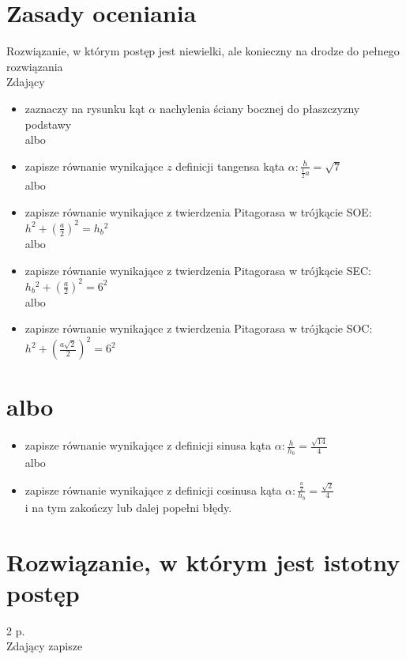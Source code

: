 \documentclass[10pt]{article}
\begin{document}
\section*{Zasady oceniania}
Rozwiązanie, w którym postęp jest niewielki, ale konieczny na drodze do pełnego rozwiązania\\
Zdający

\begin{itemize}
  \item zaznaczy na rysunku kąt $\alpha$ nachylenia ściany bocznej do płaszczyzny podstawy\\
albo
  \item zapisze równanie wynikające $z$ definicji tangensa kąta $\alpha: \frac{h}{\frac{1}{2} a}=\sqrt{7}$\\
albo
  \item zapisze równanie wynikające z twierdzenia Pitagorasa w trójkącie SOE:\\
$h^{2}+\left(\frac{a}{2}\right)^{2}=h_{b}{ }^{2}$\\
albo
  \item zapisze równanie wynikające z twierdzenia Pitagorasa w trójkącie SEC:\\
$h_{b}{ }^{2}+\left(\frac{a}{2}\right)^{2}=6^{2}$\\
albo
  \item zapisze równanie wynikające z twierdzenia Pitagorasa w trójkącie SOC:\\
$h^{2}+\left(\frac{a \sqrt{2}}{2}\right)^{2}=6^{2}$
\end{itemize}

\section*{albo}
\begin{itemize}
  \item zapisze równanie wynikające z definicji sinusa kąta $\alpha: \frac{h}{h_{b}}=\frac{\sqrt{14}}{4}$\\
albo
  \item zapisze równanie wynikające z definicji cosinusa kąta $\alpha: \frac{\frac{a}{2}}{h_{b}}=\frac{\sqrt{2}}{4}$\\
i na tym zakończy lub dalej popełni błędy.
\end{itemize}

\section*{Rozwiązanie, w którym jest istotny postęp}
2 p.\\
Zdający zapisze
\end{document}
